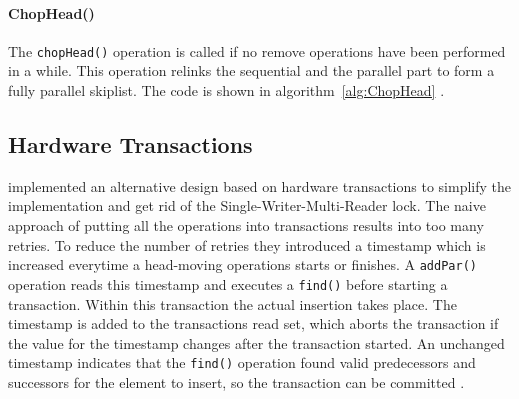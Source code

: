 \paragraph{ChopHead()}

The \texttt{chopHead()} operation is called if no remove operations have been performed in a while. This operation relinks the sequential and the parallel part to form a fully parallel skiplist. The code is shown in algorithm~\ref{alg:ChopHead} \cite{calciu_adaptive_2014}.

\subsection{Hardware Transactions}

\citeauthor{calciu_adaptive_2014} implemented an alternative design based on hardware transactions to simplify the implementation and get rid of the Single-Writer-Multi-Reader lock. The naive approach of putting all the operations into transactions results into too many retries. 
\newpage
To reduce the number of retries they introduced a timestamp which is increased everytime a head-moving operations starts or finishes. A \texttt{addPar()} operation reads this timestamp and executes a \texttt{find()} before starting a transaction. Within this transaction the actual insertion takes place. The timestamp is added to the transactions read set, which aborts the transaction if the value for the timestamp changes after the transaction started. An unchanged timestamp indicates that the \texttt{find()} operation found valid predecessors and successors for the element to insert, so the transaction can be committed \cite{calciu_adaptive_2014}. 